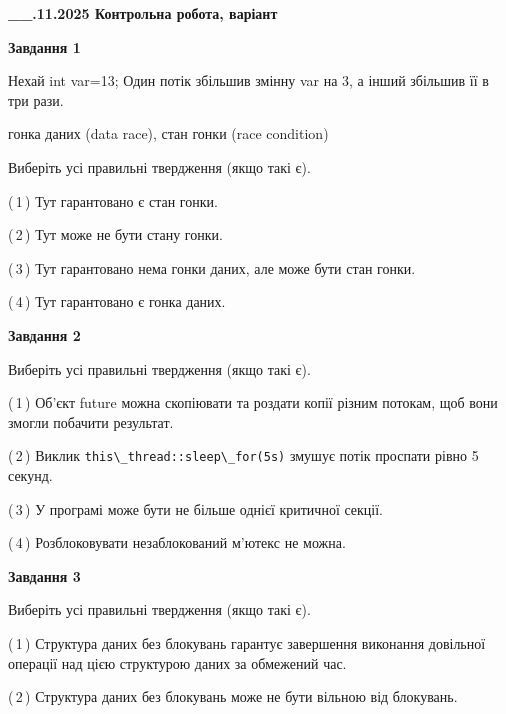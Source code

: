 \documentclass[12pt, ukrainian]{article}
\def\code#1{\Verb!#1!}
\begin{document}
\begin {large}

\textbf{\_\_.11.2025 Контрольна робота, варіант  }\par


{

\begin{center}
\textbf{Завдання 1}
\end{center}
Нехай int var=13; Один потік збільшив змінну var на 3, а інший збільшив її в три рази.

гонка даних (data race), стан гонки (race condition)

Виберіть усі правильні твердження (якщо такі є).\par
\vspace{2mm}
(\,1\,) Тут гарантовано є стан гонки.%

(\,2\,) Тут може не бути стану гонки.%

(\,3\,) Тут гарантовано нема гонки даних, але може бути стан гонки.%

(\,4\,) Тут гарантовано є гонка даних.%



\begin{center}
\textbf{Завдання 2}
\end{center}
Виберіть усі правильні твердження (якщо такі є).\par
\vspace{2mm}

(\,1\,) Об’єкт future можна скопіювати та роздати копії різним потокам, щоб вони змогли побачити результат.%

(\,2\,) Виклик \code{this\_thread::sleep\_for(5s)} змушує потік проспати рівно 5 секунд.%

(\,3\,) У програмі може бути не більше однієї критичної секції.%

(\,4\,) Розблоковувати незаблокований м’ютекс не можна.%



\begin{center}
\textbf{Завдання 3}
\end{center}
Виберіть усі правильні твердження (якщо такі є).\par
\vspace{2mm}

(\,1\,) Структура даних без блокувань гарантує завершення виконання довільної операції над цією структурою даних за обмежений час.%

(\,2\,) Структура даних без блокувань може не бути вільною від блокувань.%

}
\end{large}
\end{document}
